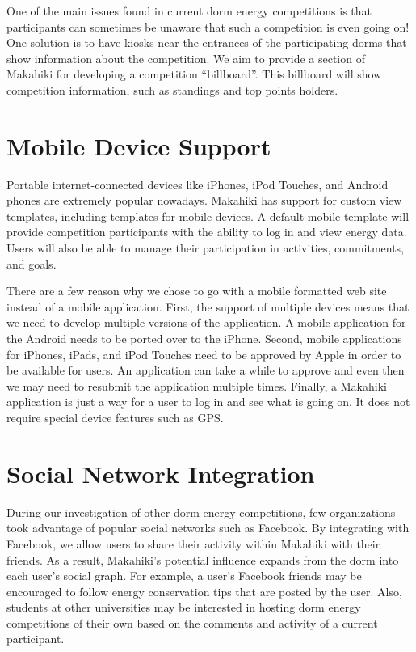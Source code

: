 One of the main issues found in current dorm energy competitions is that participants can sometimes be unaware that such a competition is even going on!  One solution is to have kiosks near the entrances of the participating dorms that show information about the competition.  We aim to provide a section of Makahiki for developing a competition ``billboard''.  This billboard will show competition information, such as standings and top points holders.

\section{Mobile Device Support}
\label{mobile}

Portable internet-connected devices like iPhones, iPod Touches, and Android phones are extremely popular nowadays.  Makahiki has support for custom view templates, including templates for mobile devices.  A default mobile template will provide competition participants with the ability to log in and view energy data.  Users will also be able to manage their participation in activities, commitments, and goals.

There are a few reason why we chose to go with a mobile formatted web site instead of a mobile application.  First, the support of multiple devices means that we need to develop multiple versions of the application.  A mobile application for the Android needs to be ported over to the iPhone. Second, mobile applications for iPhones, iPads, and iPod Touches need to be approved by Apple in order to be available for users.  An application can take a while to approve and even then we may need to resubmit the application multiple times.  Finally, a Makahiki application is just a way for a user to log in and see what is going on.  It does not require special device features such as GPS.

\section{Social Network Integration}
\label{socialint}

During our investigation of other dorm energy competitions, few organizations took advantage of popular social networks such as Facebook.  By integrating with Facebook, we allow users to share their activity within Makahiki with their friends.  As a result, Makahiki's potential influence expands from the dorm into each user's social graph.  For example, a user's Facebook friends may be encouraged to follow energy conservation tips that are posted by the user.  Also, students at other universities may be interested in hosting dorm energy competitions of their own based on the comments and activity of a current participant.

